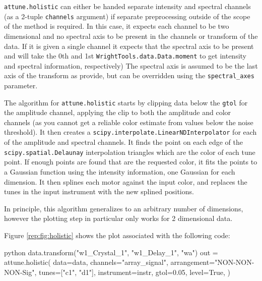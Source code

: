 \texttt{attune.holistic} can either be handed separate
intensity and spectral channels (as a 2-tuple \texttt{channels}
argument) if separate preprocessing outside of the scope of the method
is required. In this case, it expects each channel to be two dimensional
and no spectral axis to be present in the channels or transform of the
data. If it is given a single channel it expects that the spectral axis
to be present and will take the 0th and 1st
\texttt{WrightTools.data.Data.moment} to get intensity and spectral
information, respectively) The spectral axis is assumed to be the last
axis of the transform as provide, but can be overridden using the
\texttt{spectral\_axes} parameter.

The algorithm for \texttt{attune.holistic} starts by
clipping data below the \texttt{gtol} for the amplitude channel,
applying the clip to both the amplitude and color channels (as you
cannot get a reliable color estimate from values below the noise
threshold). It then creates a
\texttt{scipy.interpolate.LinearNDInterpolator} for each of the
amplitude and spectral channels. It finds the point on each edge of the
\texttt{scipy.spatial.Delaunay} interpolation triangles which are the
color of each tune point. If enough points are found that are the
requested color, it fits the points to a Gaussian function using the
intensity information, one Gaussian for each dimension. It then splines
each motor against the input color, and replaces the tunes in the input
instrument with the new splined positions.

In principle, this algorithm generalizes to an arbitrary number of
dimensions, however the plotting step in particular only works for 2
dimensional data.

Figure \ref{rep:fig:holistic} shows the plot associated with the following code:

\begin{codefragment}{python}
data.transform("w1_Crystal_1", "w1_Delay_1", "wa")
out = attune.holistic(
    data=data,
    channels="array_signal",
    arrangement="NON-NON-NON-Sig",
    tunes=["c1", "d1"],
    instrument=instr,
    gtol=0.05,
    level=True,
)
\end{codefragment}

